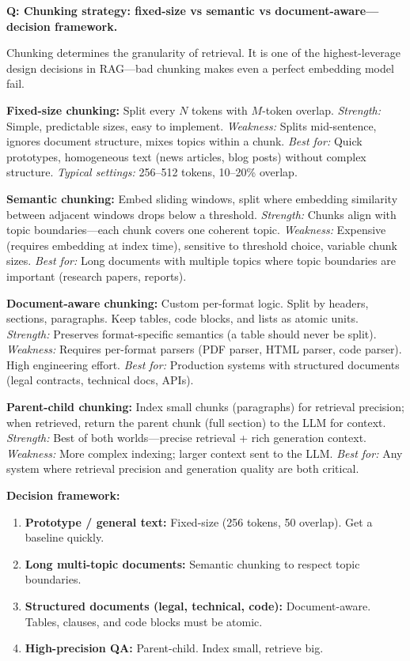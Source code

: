 \begin{interviewq}
\textbf{Q: Chunking strategy: fixed-size vs semantic vs document-aware---decision framework.}

 \quad {} \quad \badgefreq{\freqhigh}

\stronganswer

Chunking determines the granularity of retrieval. It is one of the highest-leverage design decisions in RAG---bad chunking makes even a perfect embedding model fail.

\textbf{Fixed-size chunking:} Split every $N$ tokens with $M$-token overlap. \textit{Strength:} Simple, predictable sizes, easy to implement. \textit{Weakness:} Splits mid-sentence, ignores document structure, mixes topics within a chunk. \textit{Best for:} Quick prototypes, homogeneous text (news articles, blog posts) without complex structure. \textit{Typical settings:} 256--512 tokens, 10--20\% overlap.

\textbf{Semantic chunking:} Embed sliding windows, split where embedding similarity between adjacent windows drops below a threshold. \textit{Strength:} Chunks align with topic boundaries---each chunk covers one coherent topic. \textit{Weakness:} Expensive (requires embedding at index time), sensitive to threshold choice, variable chunk sizes. \textit{Best for:} Long documents with multiple topics where topic boundaries are important (research papers, reports).

\textbf{Document-aware chunking:} Custom per-format logic. Split by headers, sections, paragraphs. Keep tables, code blocks, and lists as atomic units. \textit{Strength:} Preserves format-specific semantics (a table should never be split). \textit{Weakness:} Requires per-format parsers (PDF parser, HTML parser, code parser). High engineering effort. \textit{Best for:} Production systems with structured documents (legal contracts, technical docs, APIs).

\textbf{Parent-child chunking:} Index small chunks (paragraphs) for retrieval precision; when retrieved, return the parent chunk (full section) to the LLM for context. \textit{Strength:} Best of both worlds---precise retrieval + rich generation context. \textit{Weakness:} More complex indexing; larger context sent to the LLM. \textit{Best for:} Any system where retrieval precision and generation quality are both critical.

\textbf{Decision framework:}
\begin{enumerate}
    \item \textbf{Prototype / general text:} Fixed-size (256 tokens, 50 overlap). Get a baseline quickly.
    \item \textbf{Long multi-topic documents:} Semantic chunking to respect topic boundaries.
    \item \textbf{Structured documents (legal, technical, code):} Document-aware. Tables, clauses, and code blocks must be atomic.
    \item \textbf{High-precision QA:} Parent-child. Index small, retrieve big.
\end{enumerate}


\end{interviewq}
